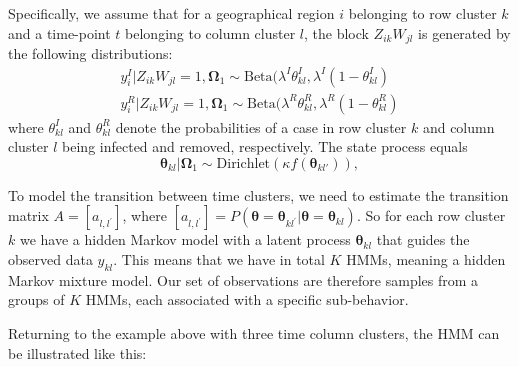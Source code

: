 \documentclass[10pt,a4paper]{article}
\begin{document}
Specifically, we assume that for a geographical region $i$ belonging to row cluster $k$ and a time-point $t$ belonging to column cluster $l$, the block $Z_{ik}W_{jl}$ is generated by the following distributions: 
%
\begin{equation}\label{statespace-observed}
	\begin{aligned}
		y_{i}^I | Z_{ik}W_{jl} = 1, \boldsymbol{\Omega}_1 \sim \text{Beta}(\lambda^I \theta_{kl}^I, \lambda^I(1 - \theta_{kl}^I) \\
		y_{i}^R | Z_{ik}W_{jl} = 1, \boldsymbol{\Omega}_1 \sim \text{Beta}(\lambda^R \theta_{kl}^R, \lambda^R(1 - \theta_{kl}^R)
	\end{aligned}
\end{equation}
% 
%
%
where  
%
$
\theta_{kl}^I
$
%
and 
%
$
\theta_{kl}^R
$
%
denote the probabilities of a case in row cluster $k$ and column cluster $l$ being infected and removed, respectively. The state process equals
%
\begin{equation}
	\boldsymbol{\theta}_{kl} | \boldsymbol{\Omega}_1 \sim \text{Dirichlet}(\kappa f(\boldsymbol{\theta}_{kl'})),
\end{equation}
%

To model the transition between time clusters, we need to estimate the transition matrix $A = [a_{l, l^\prime}]$, where
%
$
[a_{l, l^\prime}] = P(\boldsymbol{\theta} = \boldsymbol{\theta}_{kl^\prime} |\boldsymbol{\theta} = \boldsymbol{\theta}_{kl} ). 
$
%
So for each row cluster $k$ we have a hidden Markov model with a latent process $\boldsymbol{\theta}_{kl}$ that guides the observed data $y_{kl}$. This means that we have in total $K$ HMMs, meaning a hidden Markov mixture model. Our set of observations are therefore samples from a groups of $K$ HMMs, each associated with a specific sub-behavior. 

Returning to the example above with three time column clusters, the HMM can be illustrated like this:
\end{document}
